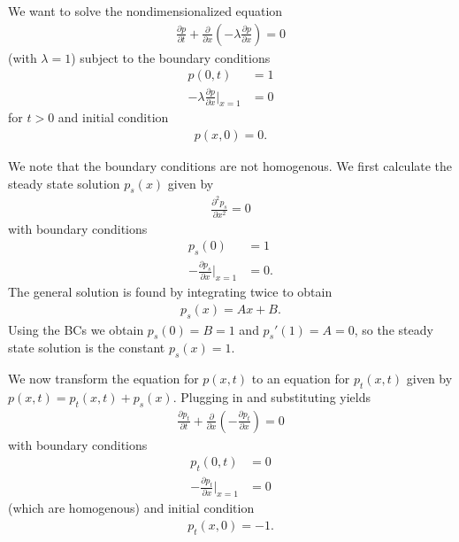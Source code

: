 \documentclass{article}
\begin{document}
We want to solve the nondimensionalized equation
\begin{align}
    \frac{\partial p}{\partial t} + \frac{\partial}{\partial x} \left( -\lambda \frac{\partial p}{\partial x} \right) = 0
\end{align}
(with $\lambda = 1$) subject to the boundary conditions
\begin{align}
    p(0, t) &= 1 \\
    -\lambda \frac{\partial p}{\partial x}\bigg\rvert_{x=1} &= 0
\end{align}
for $t > 0$ and initial condition
\begin{align}
p(x, 0) = 0.
\end{align}

We note that the boundary conditions are not homogenous.
We first calculate the steady state solution $p_s(x)$ given by
\begin{align}
    \frac{\partial^2 p_s}{\partial x^2} = 0
\end{align}
with boundary conditions
\begin{align}
    p_s(0) &= 1 \\
    -\frac{\partial p_s}{\partial x}\bigg\rvert_{x=1} &= 0.
\end{align}
The general solution is found by integrating twice to obtain
\begin{align}
    p_s(x) = Ax + B.
\end{align}
Using the BCs we obtain $p_s(0) = B = 1$ and $p_s'(1) = A = 0$, so the steady state solution is the constant $p_s(x) = 1$.

We now transform the equation for $p(x,t)$ to an equation for $p_t(x,t)$ given by $p(x,t) = p_t(x,t) + p_s(x)$.
Plugging in and substituting yields
\begin{align}
    \frac{\partial p_t}{\partial t} + \frac{\partial}{\partial x} \left( - \frac{\partial p_t}{\partial x} \right) = 0
    \label{eqn:p-transient}
\end{align}
with boundary conditions
\begin{align}
    p_t(0, t) &= 0 \\
    -\frac{\partial p_t}{\partial x}\bigg\rvert_{x=1} &= 0
\end{align}
(which are homogenous) and initial condition
\begin{align}
    p_t(x, 0) = -1.
\end{align}
\end{document}

